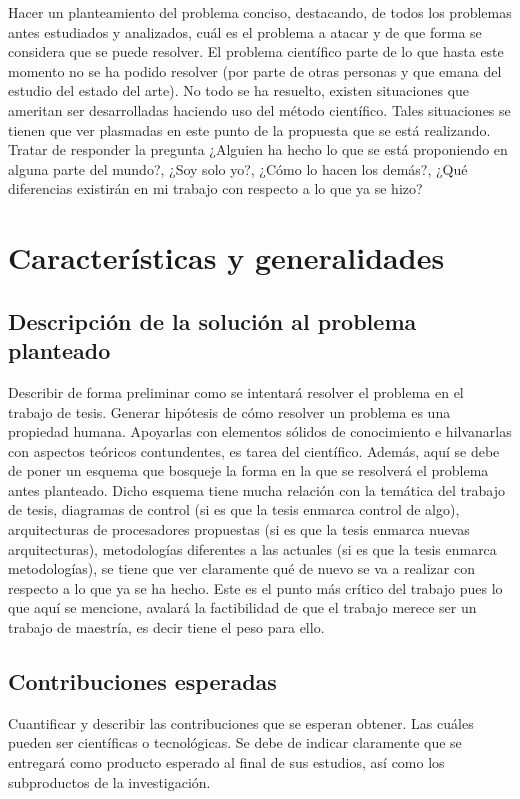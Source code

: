 \documentclass[runningheads,a4paper]{book}
\begin{document}
Hacer un planteamiento del problema conciso, destacando, de todos los problemas antes estudiados y analizados, cuál es el problema a atacar y de que forma se considera que se puede resolver. El problema científico parte de lo que hasta este momento no se ha podido resolver (por parte de otras personas y que emana del estudio del estado del arte). No todo se ha resuelto, existen situaciones que ameritan ser desarrolladas haciendo uso del método científico. Tales situaciones se tienen que ver plasmadas en este punto de la propuesta que se está realizando. Tratar de responder la pregunta ¿Alguien ha hecho lo que se está proponiendo en alguna parte del mundo?, ¿Soy solo yo?, ¿Cómo lo hacen los demás?, ¿Qué diferencias existirán en mi trabajo con respecto a lo que ya se hizo?

\section{Características y generalidades}
\subsection{Descripción de la solución al problema planteado}

Describir de forma preliminar como se intentará resolver el problema en el trabajo de tesis. Generar hipótesis de cómo resolver un problema es una propiedad humana. Apoyarlas con elementos sólidos de conocimiento e hilvanarlas con aspectos teóricos contundentes, es tarea del científico. Además, aquí se debe de poner un esquema que bosqueje la forma en la que se resolverá el problema antes planteado. Dicho esquema tiene mucha relación con la temática del trabajo de tesis, diagramas de control (si es que la tesis enmarca control de algo), arquitecturas de procesadores propuestas (si es que la tesis enmarca nuevas arquitecturas), metodologías diferentes a las actuales (si es que la tesis enmarca metodologías), se tiene que ver claramente qué de nuevo se va a realizar con respecto a lo que ya se ha hecho. Este es el punto más crítico del trabajo pues lo que aquí se mencione, avalará la factibilidad de que el trabajo merece ser un trabajo de maestría, es decir tiene el peso para ello.

\subsection{Contribuciones esperadas}

Cuantificar y describir las contribuciones que se esperan obtener. Las cuáles pueden ser científicas o tecnológicas. Se debe de indicar claramente que se entregará como producto esperado al final de sus estudios, así como los subproductos de la investigación.
\end{document}
